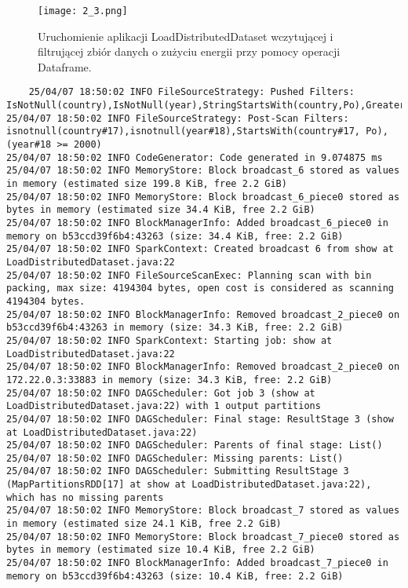 \documentclass{article}
\begin{document}
\begin{figure}
    \centering
    \texttt{[image: 2\_3.png]}
    \caption{Uruchomienie aplikacji LoadDistributedDataset wczytującej i filtrującej zbiór danych o zużyciu energii przy pomocy operacji Dataframe.}
    \label{fig:enter-label}
\end{figure}

\begin{verbatim}
    25/04/07 18:50:02 INFO FileSourceStrategy: Pushed Filters: IsNotNull(country),IsNotNull(year),StringStartsWith(country,Po),GreaterThanOrEqual(year,2000)
25/04/07 18:50:02 INFO FileSourceStrategy: Post-Scan Filters: isnotnull(country#17),isnotnull(year#18),StartsWith(country#17, Po),(year#18 >= 2000)
25/04/07 18:50:02 INFO CodeGenerator: Code generated in 9.074875 ms
25/04/07 18:50:02 INFO MemoryStore: Block broadcast_6 stored as values in memory (estimated size 199.8 KiB, free 2.2 GiB)
25/04/07 18:50:02 INFO MemoryStore: Block broadcast_6_piece0 stored as bytes in memory (estimated size 34.4 KiB, free 2.2 GiB)
25/04/07 18:50:02 INFO BlockManagerInfo: Added broadcast_6_piece0 in memory on b53ccd39f6b4:43263 (size: 34.4 KiB, free: 2.2 GiB)
25/04/07 18:50:02 INFO SparkContext: Created broadcast 6 from show at LoadDistributedDataset.java:22
25/04/07 18:50:02 INFO FileSourceScanExec: Planning scan with bin packing, max size: 4194304 bytes, open cost is considered as scanning 4194304 bytes.
25/04/07 18:50:02 INFO BlockManagerInfo: Removed broadcast_2_piece0 on b53ccd39f6b4:43263 in memory (size: 34.3 KiB, free: 2.2 GiB)
25/04/07 18:50:02 INFO SparkContext: Starting job: show at LoadDistributedDataset.java:22
25/04/07 18:50:02 INFO BlockManagerInfo: Removed broadcast_2_piece0 on 172.22.0.3:33883 in memory (size: 34.3 KiB, free: 2.2 GiB)
25/04/07 18:50:02 INFO DAGScheduler: Got job 3 (show at LoadDistributedDataset.java:22) with 1 output partitions
25/04/07 18:50:02 INFO DAGScheduler: Final stage: ResultStage 3 (show at LoadDistributedDataset.java:22)
25/04/07 18:50:02 INFO DAGScheduler: Parents of final stage: List()
25/04/07 18:50:02 INFO DAGScheduler: Missing parents: List()
25/04/07 18:50:02 INFO DAGScheduler: Submitting ResultStage 3 (MapPartitionsRDD[17] at show at LoadDistributedDataset.java:22), which has no missing parents
25/04/07 18:50:02 INFO MemoryStore: Block broadcast_7 stored as values in memory (estimated size 24.1 KiB, free 2.2 GiB)
25/04/07 18:50:02 INFO MemoryStore: Block broadcast_7_piece0 stored as bytes in memory (estimated size 10.4 KiB, free 2.2 GiB)
25/04/07 18:50:02 INFO BlockManagerInfo: Added broadcast_7_piece0 in memory on b53ccd39f6b4:43263 (size: 10.4 KiB, free: 2.2 GiB)

\end{verbatim}
\end{document}
